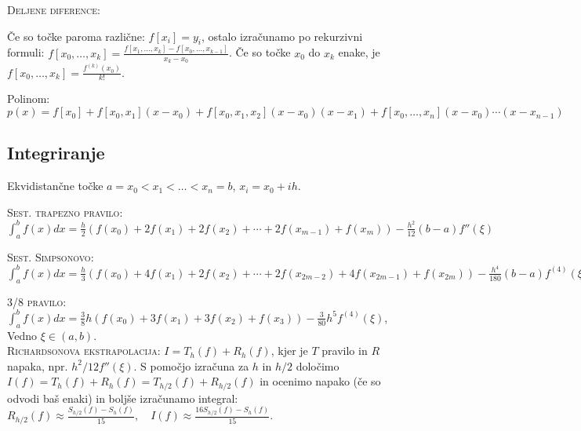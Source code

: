\documentclass[a4paper,10pt]{article}
\theoremstyle{definition}
\begin{document}
\textsc{Deljene diference:}

Če so točke paroma različne: $f[x_i] = y_i$, ostalo izračunamo po
rekurzivni formuli: $f[x_0, \ldots, x_k] = \frac{f[x_1, \ldots, x_k] -f[x_0, \ldots, x_{k-1}] }{x_k-x_0}$. Če
so točke $x_0$ do $x_k$ enake, je $f[x_0, \ldots, x_k] = \frac{f^{(k)}(x_0)}{k!}$.

Polinom: $p(x) = f[x_0] + f[x_0, x_1] (x-x_0) + f[x_0, x_1, x_2] (x-x_0)(x-x_1) +
f[x_0, \dots, x_n](x-x_0)\cdots (x-x_{n-1})$

\subsection*{Integriranje}

Ekvidistančne točke $a = x_0 < x_1 < \dots < x_n = b$, $x_i = x_0 + ih$.

\textsc{Sest. trapezno pravilo:} $\int_{a}^{b} f(x) dx = \frac{h}{2} (f(x_0)+2f(x_1)
+2f(x_2)+\cdots + 2f(x_{m-1})+f(x_m))-\frac{h^2}{12}(b-a)f''(\xi)$

\textsc{Sest. Simpsonovo:} $\int_{a}^{b} f(x) dx = \frac{h}{3} (f(x_0)+4f(x_1)
+2f(x_2)+\cdots + 2f(x_{2m-2})+4f(x_{2m-1})+f(x_{2m}))-\frac{h^4}{180}(b-a)f^{(4)}(\xi)$

\textsc{3/8 pravilo:} $\int_a^b f(x) dx = \frac{3}{8} h(f(x_0) + 3f(x_1)
+ 3f(x_2) + f(x_3)) - \frac{3}{80} h^5f^{(4)}(\xi)$, Vedno $\xi \in (a, b)$.
\\[-8pt]

\textsc{Richardsonova ekstrapolacija:} $I = T_h(f) + R_h(f)$, kjer je $T$
pravilo in $R$ napaka, npr. $h^2/12 f''(\xi)$.
S pomočjo izračuna za $h$ in $h/2$ določimo $I(f) = T_h(f) + R_h(f) = T_{h/2}(f) +
R_{h/2}(f)$ in ocenimo napako (če so odvodi baš enaki) in boljše izračunamo integral:
$R_{h/2}(f) \approx \frac{S_{h/2}(f) - S_h(f)}{15}, \quad I(f) \approx
\frac{16S_{h/2}(f) - S_h(f)}{15}$.
\end{document}
